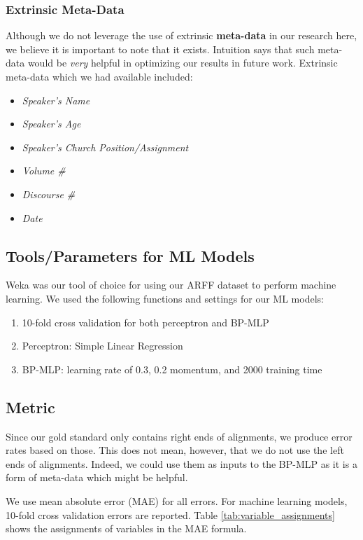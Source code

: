 \subsubsection{Extrinsic Meta-Data}
Although we do not leverage the use of extrinsic \textbf{meta-data} in our research here, we believe it is important to note that it exists. Intuition says that such meta-data would be \textit{very} helpful in optimizing our results in future work. Extrinsic meta-data which we had available included:
	\begin{itemize}
		\item \textit{Speaker's Name}
		\item \textit{Speaker's Age}
		\item \textit{Speaker's Church Position/Assignment}
		\item \textit{Volume \#}
		\item \textit{Discourse \#}
		\item \textit{Date}
	\end{itemize}

\subsection{Tools/Parameters for ML Models}
Weka \cite{weka_2009} was our tool of choice for using our ARFF dataset to perform machine learning. We used the following functions and settings for our ML models:
\begin{enumerate}
	\item 10-fold cross validation for both perceptron and BP-MLP
	\item Perceptron: Simple Linear Regression
	\item BP-MLP: learning rate of 0.3, 0.2 momentum, and 2000 training time
\end{enumerate}

\subsection{Metric}
Since our gold standard only contains right ends of alignments, we produce error rates based on those. This does not mean, however, that we do not use the left ends of alignments. Indeed, we could use them as inputs to the BP-MLP as it is a form of meta-data which might be helpful.

We use mean absolute error (MAE) for all errors. For machine learning models, 10-fold cross validation errors are reported. Table \ref{tab:variable_assignments} shows the assignments of variables in the MAE formula.

